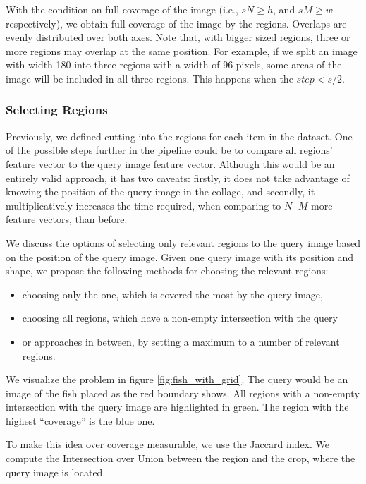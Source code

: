 With the condition on full coverage of the image (i.e., $s N \geq h$, and  $s M \geq w$ respectively), we obtain full coverage of the image by the regions. Overlaps are evenly distributed over both axes. Note that, with bigger sized regions, three or more regions may overlap at the same position. For example, if we split an image with width 180 into three regions with a width of 96 pixels, some areas of the image will be included in all three regions. This happens when the $step < s/2$.

\subsubsection{Selecting Regions}

Previously, we defined cutting into the regions for each item in the dataset. One of the possible steps further in the pipeline could be to compare all regions' feature vector to the query image feature vector. Although this would be an entirely valid approach, it has two caveats: firstly, it does not take advantage of knowing the position of the query image in the collage, and secondly, it multiplicatively increases the time required, when comparing to $N \cdot M$ more feature vectors, than before.

We discuss the options of selecting only relevant regions to the query image based on the position of the query image. Given one query image with its position and shape, we propose the following methods for choosing the relevant regions:
\begin{itemize}
  \item choosing only the one, which is covered the most by the query image,
  \item choosing all regions, which have a non-empty intersection with the query
  \item or approaches in between, by setting a maximum to a number of relevant regions.
\end{itemize}

We visualize the problem in figure \ref{fig:fish_with_grid}. The query would be an image of the fish placed as the red boundary shows. All regions with a non-empty intersection with the query image are highlighted in green. The region with the highest ``coverage'' is the blue one.

To make this idea over coverage measurable, we use the Jaccard index. We compute the Intersection over Union between the region and the crop, where the query image is located. 

